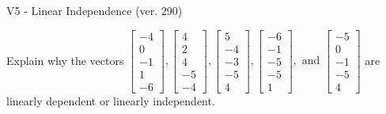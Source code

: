 \begin{exercise}
  \begin{exerciseTitle}V5 - Linear Independence (ver. 290)\end{exerciseTitle}
  \begin{exerciseStatement}
    Explain why the vectors \(\left[\begin{array}{r}
-4 \\
0 \\
-1 \\
1 \\
-6
\end{array}\right] , \left[\begin{array}{r}
4 \\
2 \\
4 \\
-5 \\
-4
\end{array}\right] , \left[\begin{array}{r}
5 \\
-4 \\
-3 \\
-5 \\
4
\end{array}\right] , \left[\begin{array}{r}
-6 \\
-1 \\
-5 \\
-5 \\
1
\end{array}\right] , \text{ and } \left[\begin{array}{r}
-5 \\
0 \\
-1 \\
-5 \\
4
\end{array}\right]\) are linearly dependent or linearly independent.	



\end{exerciseStatement}
\end{exercise}
